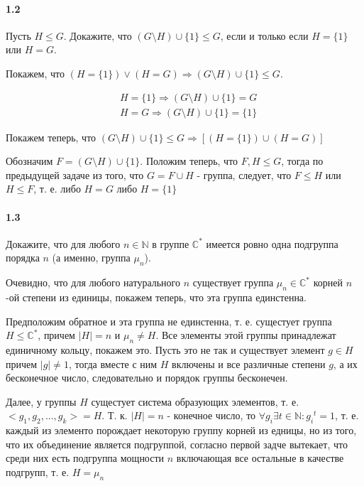 \documentclass[a4paper,12pt]{article}
\begin{document}
\paragraph{1.2} Пусть $H \le G$. Докажите, что $\left(G \setminus H\right) \cup \{1\} \le G$, если и только если $H = \{1\}$ или $H = G$.

\begin{Proof}
Покажем, что $\left(H=\{1\}\right) \lor \left(H = G\right) \Rightarrow \left(G \setminus H\right) \cup \{1\} \le G$.

\[
	\begin{split}
		& H=\{1\} \Rightarrow \left(G \setminus H\right) \cup \{1\} = G \\
		& H=G \Rightarrow \left(G \setminus H\right) \cup \{1\} = \{1\}
	\end{split}
\]

Покажем теперь, что $\left(G \setminus H\right) \cup \{1\} \le G \Rightarrow \left[\left(H=\{1\}\right)\cup\left(H=G\right)\right]$

Обозначим $F = \left(G \setminus H\right) \cup \{1\}$. Положим теперь, что $F,H \le G$, тогда по предыдущей задаче из того, что $G = F \cup H$ - группа, следует, что $F \le H$ или $H \le F$, т. е. либо $H = G$ либо $H = \{1\}$
\end{Proof}

\paragraph{1.3} Докажите, что для любого $n \in \mathbb{N}$ в группе $\mathbb{C}^*$ имеется ровно одна подгруппа порядка $n$ (а именно, группа $\mu_n$).

\begin{Proof}
Очевидно, что для любого натурального $n$ существует группа $\mu_n \in \mathbb{C}^*$ корней $n$-ой степени из единицы, покажем теперь, что эта группа единстенна.

Предположим обратное и эта группа не единстенна, т. е. сущестует группа $H \le \mathbb{C}^*$, причем $\left|H\right| = n$ и $\mu_n \not= H$. Все элементы этой группы принадлежат единичному кольцу, покажем это. Пусть это не так и существует элемент $g \in H$ причем $\left|g\right| \not= 1$, тогда вместе с ним  $H$ включены и все различные степени $g$, а их бесконечное число, следовательно и порядок группы бесконечен.

Далее, у группы $H$ сущестует система образующих элементов, т. е. $<g_1, g_2, ... ,g_k> = H$. Т. к. $\left|H\right| = n$ - конечное число, то $\forall g_i \exists t \in \mathbb{N} : {g_i}^{t}=1$, т. е. каждый из элементо порождает некоторую группу корней из едницы, но из того, что их объединение является подгруппой, согласно первой задче вытекает, что среди них есть подгруппа мощности $n$ включающая все остальные в качестве подгрупп, т. е. $H = \mu_n$
\end{Proof}
\end{document}
